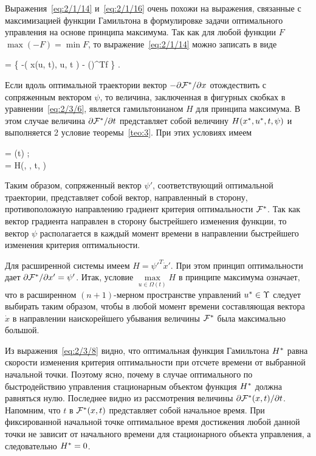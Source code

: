 \br

Выражения~\ref{eq:2/1/14} и~\vref{eq:2/1/16} очень похожи на выражения, связанные с максимизацией функции Гамильтона в формулировке задачи оптимального управления на основе принципа максимума. Так как для любой функции $F$ $\max(-F) = \min F$, то выражение~\ref{eq:2/1/14} можно записать в виде

     =  \Bigl\{ -\funcL\bigl( x(u, t), u, t \bigr) - \biggl(\biggr)^Tf \Bigr\} \mbox{.}
\eeq

Если вдоль оптимальной траектории вектор $-\partial {    \mathcal{F}  ^{*}  } / \partial {x}$ отождествить с сопряженным вектором $\psi$, то величина, заключенная в фигурных скобках в уравнении~\ref{eq:2/3/6}, является гамильтонианом $H$ для принципа максимума. В этом случае величина $\partial {    \mathcal{F}  ^{*}  } / \partial {t}$ представляет собой величину $H(x^{*}, u^{*}, t, \psi)$ и выполняется 2 условие теоремы~\vref{teo:3}. При этих условиях имеем

\beqarr
    	 = \psi(t) \mbox{;} \\
    	 = \funcH \eqdef H(\optX, \optU, t, \psi)
\eeqarr

Таким образом, сопряженный вектор $\psi'$, соответствующий оптимальной траектории, представляет собой вектор, направленный в сторону, противоположную направлению градиент критерия оптимальности $\mathcal{F}^{*}$. Так как вектор градиента направлен в сторону быстрейшего изменения функции, то вектор $\psi$ располагается в каждый момент времени в направлении быстрейшего изменения критерия оптимальности.

Для расширенной системы имеем $H = \psi'^T\dot{x}'$. При этом принцип оптимальности дает $\partial {    \mathcal{F}  ^{*}  } / \partial {x'} = \psi'$. Итак, условие $\max\limits_{u \in \Omega(t)} H$ в принципе максимума означает, что в расширенном $(n+1)$-мерном пространстве управлений $u^{*} \in \Upsilon$ следует выбирать таким образом, чтобы в любой момент времени составляющая вектора $\dot{x}$ в направлении наискорейшего убывания величины $\mathcal{F}^{*}$ была максимально большой.

Из выражения~\ref{eq:2/3/8} видно, что оптимальная функция Гамильтона $H^{*}$ равна скорости изменения критерия оптимальности при отсчете времени от выбранной начальной точки. Поэтому ясно, почему в случае оптимального по быстродействию управления стационарным объектом функция $H^{*}$ должна равняться нулю. Последнее видно из рассмотрения величины $\partial {    \mathcal{F}  ^{*}  (x, t)} / \partial {t}$. Напомним, что $t$ в $\mathcal{F}^{*}(x, t)$ представляет собой начальное время. При фиксированной начальной точке оптимальное время достижения любой данной точки не зависит от начального времени для стационарного объекта управления, а следовательно $H^{*} = 0$.

